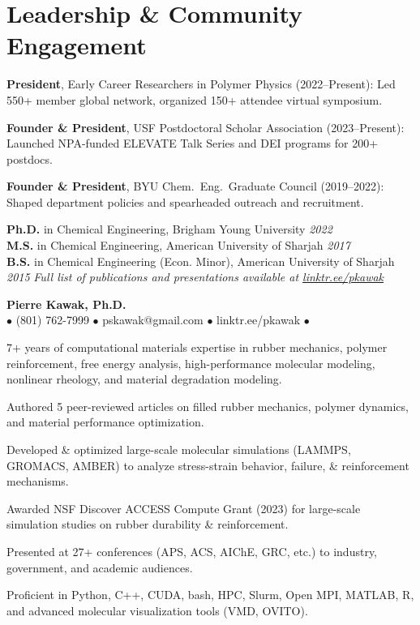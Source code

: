 \section*{Leadership \& Community Engagement}
\begin{tabitemize}[leftmargin=*]
  \item \textbf{President}, Early Career Researchers in Polymer Physics (2022–Present): Led 550+ member global network, organized 150+ attendee virtual symposium.
  \item \textbf{Founder \& President}, USF Postdoctoral Scholar Association (2023–Present): Launched NPA-funded ELEVATE Talk Series and DEI programs for 200+ postdocs.
  \item \textbf{Founder \& President}, BYU Chem.~Eng.~Graduate Council (2019–2022): Shaped department policies and spearheaded outreach and recruitment.
\end{tabitemize}
\textbf{Ph.D.} in Chemical Engineering, Brigham Young University \hfill \textit{2022} \\
\textbf{M.S.} in Chemical Engineering, American University of Sharjah \hfill \textit{2017} \\
\textbf{B.S.} in Chemical Engineering (Econ. Minor), American University of Sharjah \hfill \textit{2015}
\vspace{0.5em}
\noindent\textit{Full list of publications and presentations available at \href{https://linktr.ee/pkawak}{linktr.ee/pkawak}}

\begin{center}
  {\LARGE \textbf{Pierre Kawak, Ph.D.} }\\[1ex]
  $\bullet$ (801) 762-7999 $\bullet$ pskawak@gmail.com $\bullet$ linktr.ee/pkawak $\bullet$ \\
\end{center}
\vspace{-0.5cm}
\begin{tabitemize}
  \item 7+ years of computational materials expertise in rubber mechanics, polymer reinforcement, free energy analysis, high-performance molecular modeling, nonlinear rheology, and material degradation modeling.
  \item Authored 5 peer-reviewed articles on filled rubber mechanics, polymer dynamics, and material performance optimization.
  \item Developed \& optimized large-scale molecular simulations (LAMMPS, GROMACS, AMBER) to analyze stress-strain behavior, failure, \& reinforcement mechanisms.
  \item Awarded NSF Discover ACCESS Compute Grant (2023) for large-scale simulation studies on rubber durability \& reinforcement.
  \item Presented at 27+ conferences (APS, ACS, AIChE, GRC, etc.) to industry, government, and academic audiences.
  \item Proficient in Python, C++, CUDA, bash, HPC, Slurm, Open MPI, MATLAB, R, and advanced molecular visualization tools (VMD, OVITO).
\end{tabitemize}
\vspace{-1.5\baselineskip}
